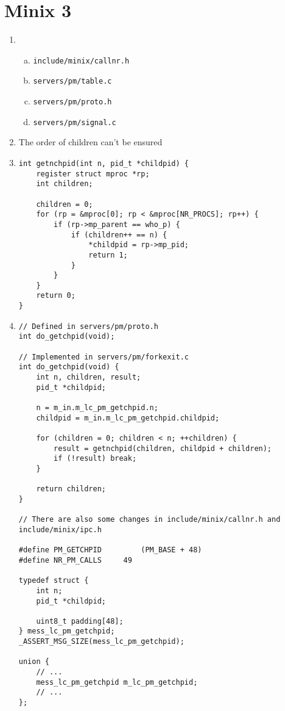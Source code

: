 \documentclass{article}
\begin{document}
\section{Minix 3}
\begin{enumerate}
\item
\begin{enumerate}[a)]
\item \texttt{include/minix/callnr.h}
\item \texttt{servers/pm/table.c}
\item \texttt{servers/pm/proto.h}
\item \texttt{servers/pm/signal.c}
\end{enumerate}
\item
The order of children can't be ensured
\item
\begin{verbatim}
int getnchpid(int n, pid_t *childpid) {
    register struct mproc *rp;
    int children;

    children = 0;
    for (rp = &mproc[0]; rp < &mproc[NR_PROCS]; rp++) {
        if (rp->mp_parent == who_p) {
            if (children++ == n) {
                *childpid = rp->mp_pid;
                return 1;
            }
        }
    }
    return 0;
}
\end{verbatim}
\item
\begin{verbatim}
// Defined in servers/pm/proto.h
int do_getchpid(void);

// Implemented in servers/pm/forkexit.c
int do_getchpid(void) {
    int n, children, result;
    pid_t *childpid;

    n = m_in.m_lc_pm_getchpid.n;
    childpid = m_in.m_lc_pm_getchpid.childpid;

    for (children = 0; children < n; ++children) {
        result = getnchpid(children, childpid + children);
        if (!result) break;
    }

    return children;
}

// There are also some changes in include/minix/callnr.h and include/minix/ipc.h

#define PM_GETCHPID         (PM_BASE + 48)
#define NR_PM_CALLS		49

typedef struct {
  	int n;
  	pid_t *childpid;

  	uint8_t padding[48];
} mess_lc_pm_getchpid;
_ASSERT_MSG_SIZE(mess_lc_pm_getchpid);

union {
    // ...
    mess_lc_pm_getchpid m_lc_pm_getchpid;
    // ...
};


\end{verbatim}
\end{enumerate}
\end{document}
